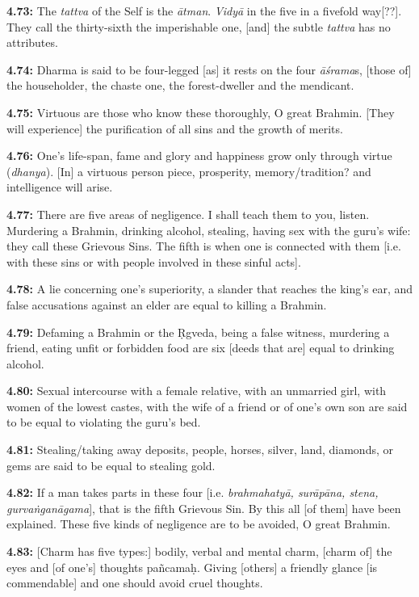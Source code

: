 \documentclass{article}
\newcommand{\vsnum}[1]{\textbf{#1}}
\newcommand{\skt}[1]{\textit{#1}}
\begin{document}
\vsnum{4.73: }The \skt{tattva} of the Self is the \skt{ātman}. \skt{Vidyā} in the five in a fivefold way[??]. They call the thirty-sixth the imperishable one, [and] the subtle \skt{tattva} has no attributes.

\vsnum{4.74: }Dharma is said to be four-legged [as] it rests on the four \skt{āśrama}s, [those of] the householder, the chaste one, the forest-dweller and the mendicant.

\vsnum{4.75: }Virtuous are those who know these thoroughly, O great Brahmin. [They will experience] the purification of all sins and the growth of merits.

\vsnum{4.76: }One's life-span, fame and glory and happiness grow only through virtue (\skt{dhanya}). [In] a virtuous person piece, prosperity, memory/tradition? and intelligence will arise.

\vsnum{4.77: }There are five areas of negligence. I shall teach them to you, listen. Murdering a Brahmin, drinking alcohol, stealing, having sex with the guru's wife: they call these Grievous Sins. The fifth is when one is connected with them [i.e. with these sins or with people involved in these sinful acts].

\vsnum{4.78: }A lie concerning one's superiority, a slander that reaches the king's ear, and false accusations against an elder are equal to killing a Brahmin.

\vsnum{4.79: }Defaming a Brahmin or the Ṛgveda, being a false witness, murdering a friend, eating unfit or forbidden food are six [deeds that are] equal to drinking alcohol.

\vsnum{4.80: }Sexual intercourse with a female relative, with an unmarried girl, with women of the lowest castes, with the wife of a friend or of one's own son are said to be equal to violating the guru's bed.

\vsnum{4.81: }Stealing/taking away deposits, people, horses, silver, land, diamonds, or gems are said to be equal to stealing gold.

\vsnum{4.82: }If a man takes parts in these four [i.e. \skt{brahmahatyā, surāpāna, stena, gurvaṅganāgama}], that is the fifth Grievous Sin. By this all [of them] have been explained. These five kinds of negligence are to be avoided, O great Brahmin.

\vsnum{4.83: }[Charm has five types:] bodily, verbal and mental charm, [charm of] the eyes and [of one's] thoughts pañcamaḥ. Giving [others] a friendly glance [is commendable] and one should avoid cruel thoughts.
\end{document}
